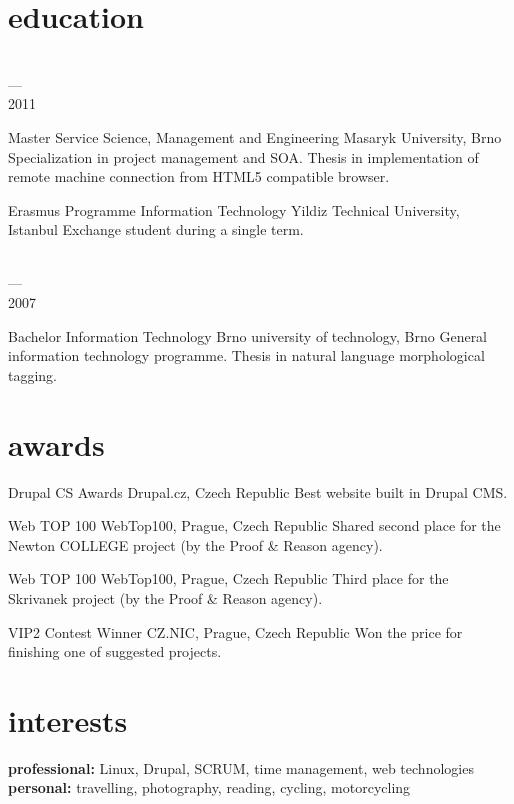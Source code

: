 \documentclass[]{friggeri-cv} %
\begin{document}
    \pagebreak



    \section{education}

    \begin{entrylist}
        \entry
        {\parbox[t]{2cm}{ \\ --- \\ 2011}}
        {Master {\normalfont Service Science, Management and Engineering}}
        {Masaryk University, Brno}
        {
            \thesis
            {Specialization in project management and SOA.}
            {Thesis in implementation of remote machine connection from HTML5 compatible browser.}
        }
        \entry
        {\parbox[t]{2cm}{}}
        {Erasmus Programme {\normalfont Information Technology}}
        {Yildiz Technical University, Istanbul}
        {Exchange student during a single term.\medskip}
        \entry
        {\parbox[t]{2cm}{ \\ --- \\ 2007}}
        {Bachelor {\normalfont Information Technology}}
        {Brno university of technology, Brno}
        {
            \thesis
            {General information technology programme.}
            {Thesis in natural language morphological tagging.}
        }
    \end{entrylist}



    \section{awards}

    \begin{entrylist}
        \entry
        {\parbox[t]{2cm}{}}
        {Drupal CS Awards}
        {Drupal.cz, Czech Republic}
        {Best website built in Drupal CMS.}
        \entry
        {\parbox[t]{2cm}{}}
        {Web TOP 100}
        {WebTop100, Prague, Czech Republic}
        {Shared second place for the Newton COLLEGE project (by the Proof \& Reason agency).}
        \entry
        {\parbox[t]{2cm}{}}
        {Web TOP 100}
        {WebTop100, Prague, Czech Republic}
        {Third place for the Skrivanek project (by the Proof \& Reason agency).}
        \entry
        {\parbox[t]{2cm}{}}
        {VIP2 Contest Winner}
        {CZ.NIC, Prague, Czech Republic}
        {Won the price for finishing one of suggested projects.}
    \end{entrylist}

    \section{interests}

    \textbf{professional:} Linux, Drupal, SCRUM, time management, web technologies \\
    \textbf{personal:} travelling, photography, reading, cycling, motorcycling
\end{document}

